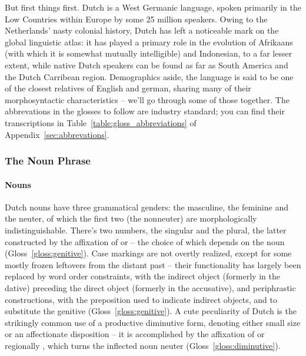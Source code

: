 But first things first.
Dutch is a West Germanic language, spoken primarily in the Low Countries within Europe by some 25 million speakers.
Owing to the Netherlands' nasty colonial history, Dutch has left a noticeable mark on the global linguistic atlas: it has played a primary role in the evolution of Afrikaans (with which it is somewhat mutually intelligible) and Indonesian, to a far lesser extent, while native Dutch speakers can be found as far as South America and the Dutch Carribean region.
Demographics aside, the language is said to be one of the closest relatives of English and german, sharing many of their morphosyntactic characteristics -- we'll go through some of those together.
The abbrevations in the glosses to follow are industry standard; you can find their transcriptions in Table~\ref{table:gloss_abbreviations} of Appendix~\ref{sec:abbrevations}.

\subsubsection{The Noun Phrase}
\paragraph{Nouns}
Dutch nouns have three grammatical genders: the masculine, the feminine and the neuter, of which the first two (the nonneuter) are morphologically indistinguishable.
There's two numbers, the singular and the plural, the latter constructed by the affixation of  or  -- the choice of which depends on the noun (Gloss~\ref{gloss:genitive}).
Case markings are not overtly realized, except for some mostly frozen leftovers from the distant past -- their functionality has largely been replaced by word order constraints, with the indirect object (formerly in the dative) preceding the direct object (formerly in the accusative), and periphrastic constructions, with the preposition  used to indicate indirect objects, and  to substitute the genitive (Gloss~\ref{gloss:genitive}).
A cute peculiarity of Dutch is the strikingly common use of a productive diminutive form, denoting either small size or an affectionate disposition -- it is accomplished by the affixation of  or regionally , which turns the inflected noun neuter (Gloss~\ref{gloss:diminutive}).

